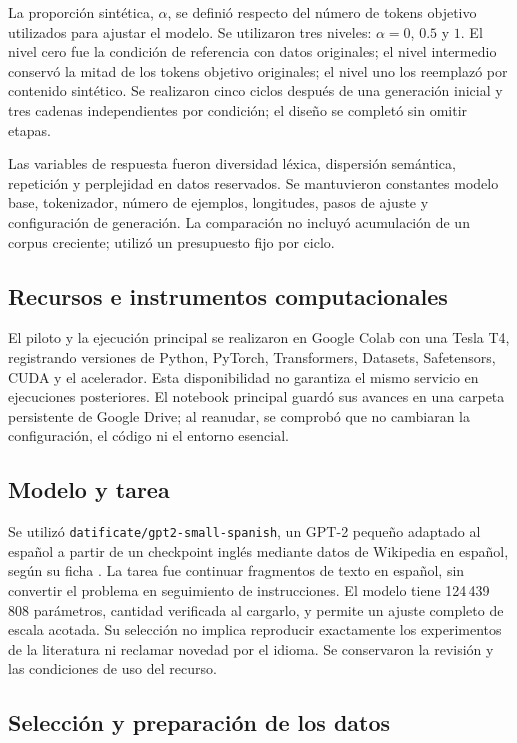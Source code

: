 \documentclass[12pt,letterpaper]{article}
\begin{document}
La proporción sintética, \(\alpha\), se definió respecto del número de
tokens objetivo utilizados para ajustar el modelo. Se utilizaron tres niveles:
\(\alpha=0\), \(0.5\) y \(1\). El nivel cero fue la condición de referencia
con datos originales; el nivel intermedio conservó la mitad de los tokens
objetivo originales; el nivel uno los reemplazó por contenido sintético.
Se realizaron cinco ciclos después de una generación inicial y tres cadenas
independientes por condición; el diseño se completó sin omitir etapas.

Las variables de respuesta fueron diversidad léxica, dispersión semántica,
repetición y perplejidad en datos reservados. Se mantuvieron constantes
modelo base, tokenizador, número de ejemplos, longitudes, pasos de ajuste
y configuración de generación. La comparación no incluyó acumulación de
un corpus creciente; utilizó un presupuesto fijo por ciclo.

\subsection{Recursos e instrumentos computacionales}

El piloto y la ejecución principal se realizaron en Google Colab con una
Tesla T4, registrando versiones de Python, PyTorch, Transformers, Datasets,
Safetensors, CUDA y el acelerador. Esta disponibilidad no garantiza el
mismo servicio en ejecuciones posteriores. El notebook principal guardó
sus avances en una carpeta persistente de Google Drive; al reanudar, se
comprobó que no cambiaran la configuración, el código ni el entorno esencial.

\subsection{Modelo y tarea}

Se utilizó \texttt{datificate/gpt2-small-spanish}, un GPT-2 pequeño
adaptado al español a partir de un checkpoint inglés mediante datos de
Wikipedia en español, según su ficha \cite{spanishmodelcard}. La tarea
fue continuar fragmentos de texto en español, sin convertir el problema
en seguimiento de instrucciones. El modelo tiene 124\,439\,808 parámetros,
cantidad verificada al cargarlo, y permite un ajuste completo de escala
acotada. Su selección no implica reproducir exactamente los
experimentos de la literatura ni reclamar novedad por el idioma.
Se conservaron la revisión y las condiciones de uso del recurso.

\subsection{Selección y preparación de los datos}
\end{document}
